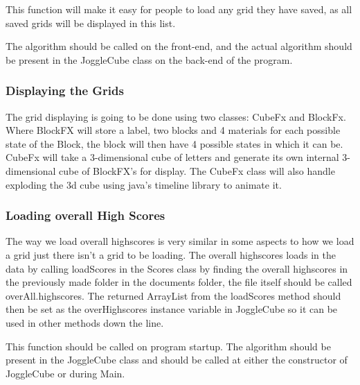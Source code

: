     This function will make it easy for people to load any grid they have saved, as all saved grids will be displayed in this list.
    
    The algorithm should be called on the front-end, and the actual algorithm should be present in the JoggleCube class on the back-end of the program.
    
    \subsubsection{Displaying the Grids} %
    The grid displaying is going to be done using two classes: CubeFx and BlockFx. Where BlockFX will store a label, two blocks and 4 materials for each possible state of the Block, the block will then have 4 possible states in which it can be. CubeFx will take a 3-dimensional cube of letters and generate its own internal 3-dimensional cube of BlockFX's for display. The CubeFx class will also handle exploding the 3d cube using java's timeline library to animate it.
    
    \subsubsection{Loading overall High Scores}
    The way we load overall highscores is very similar in some aspects to how we load a grid just there isn't a grid to be loading. The overall highscores loads in the data by calling loadScores in the Scores class by finding the overall highscores in the previously made folder in the documents folder, the file itself should be called overAll.highscores. The returned ArrayList from the loadScores method should then be set as the overHighscores instance variable in JoggleCube so it can be used in other methods down the line.
    
    This function should be called on program startup. The algorithm should be present in the JoggleCube class and should be called at either the constructor of JoggleCube or during Main.
    
